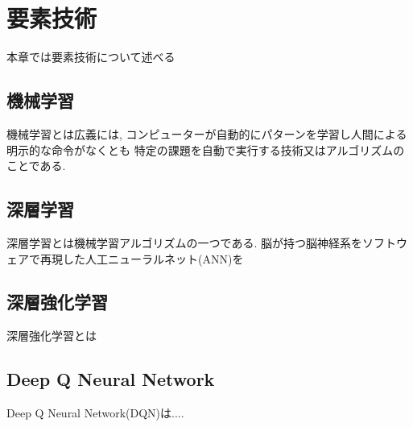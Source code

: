\chapter{要素技術}
\label{technical_background}

本章では要素技術について述べる


\section{機械学習}

機械学習とは広義には, コンピューターが自動的にパターンを学習し人間による明示的な命令がなくとも
特定の課題を自動で実行する技術又はアルゴリズムのことである. 

\section{深層学習}

深層学習とは機械学習アルゴリズムの一つである. 脳が持つ脳神経系をソフトウェアで再現した人工ニューラルネット(ANN)を

\section{深層強化学習}

深層強化学習とは

\section{Deep Q Neural Network}

Deep Q Neural Network(DQN)は....



